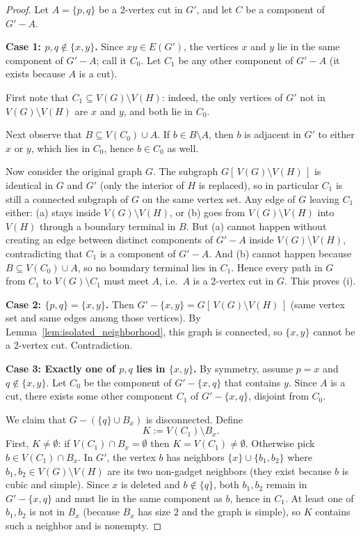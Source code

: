 \documentclass[12pt]{article}
\theoremstyle{definition}
\begin{document}
\begin{proof}
Let $A=\{p,q\}$ be a 2-vertex cut in $G'$, and let $C$ be a component of $G'-A$.

\smallskip
\noindent\textbf{Case 1: $p,q\notin\{x,y\}$.}
Since $xy\in E(G')$, the vertices $x$ and $y$ lie in the same component of $G'-A$; call it $C_0$.
Let $C_1$ be any other component of $G'-A$ (it exists because $A$ is a cut).

First note that $C_1\subseteq V(G)\setminus V(H)$: indeed, the only vertices of $G'$ not in
$V(G)\setminus V(H)$ are $x$ and $y$, and both lie in $C_0$.

Next observe that $B\subseteq V(C_0)\cup A$.
If $b\in B\setminus A$, then $b$ is adjacent in $G'$ to either $x$ or $y$, which lies in $C_0$,
hence $b\in C_0$ as well.

Now consider the original graph $G$. The subgraph $G[\,V(G)\setminus V(H)\,]$ is identical in $G$
and $G'$ (only the interior of $H$ is replaced), so in particular $C_1$ is still a connected subgraph
of $G$ on the same vertex set. Any edge of $G$ leaving $C_1$ either:
(a) stays inside $V(G)\setminus V(H)$, or (b) goes from $V(G)\setminus V(H)$ into $V(H)$ through a
boundary terminal in $B$.
But (a) cannot happen without creating an edge between distinct components of $G'-A$ inside
$V(G)\setminus V(H)$, contradicting that $C_1$ is a component of $G'-A$.
And (b) cannot happen because $B\subseteq V(C_0)\cup A$, so no boundary terminal lies in $C_1$.
Hence every path in $G$ from $C_1$ to $V(G)\setminus C_1$ must meet $A$, i.e.\ $A$ is a 2-vertex cut in $G$.
This proves (i).

\smallskip
\noindent\textbf{Case 2: $\{p,q\}=\{x,y\}$.}
Then $G'-\{x,y\}=G[\,V(G)\setminus V(H)\,]$ (same vertex set and same edges among those vertices).
By Lemma~\ref{lem:isolated_neighborhood}, this graph is connected, so $\{x,y\}$ cannot be a 2-vertex cut.
Contradiction.

\smallskip
\noindent\textbf{Case 3: Exactly one of $p,q$ lies in $\{x,y\}$.}
By symmetry, assume $p=x$ and $q\notin\{x,y\}$.
Let $C_0$ be the component of $G'-\{x,q\}$ that contains $y$.
Since $A$ is a cut, there exists some other component $C_1$ of $G'-\{x,q\}$, disjoint from $C_0$.

We claim that $G-(\{q\}\cup B_x)$ is disconnected.
Define
\[
K := V(C_1)\setminus B_x.
\]
First, $K\neq\emptyset$: if $V(C_1)\cap B_x=\emptyset$ then $K=V(C_1)\neq\emptyset$.
Otherwise pick $b\in V(C_1)\cap B_x$. In $G'$, the vertex $b$ has neighbors $\{x\}\cup\{b_1,b_2\}$
where $b_1,b_2\in V(G)\setminus V(H)$ are its two non-gadget neighbors (they exist because $b$ is cubic
and simple). Since $x$ is deleted and $b\notin\{q\}$, both $b_1,b_2$ remain in $G'-\{x,q\}$ and must lie
in the same component as $b$, hence in $C_1$. At least one of $b_1,b_2$ is not in $B_x$ (because $B_x$
has size $2$ and the graph is simple), so $K$ contains such a neighbor and is nonempty.


\end{proof}
\end{document}
